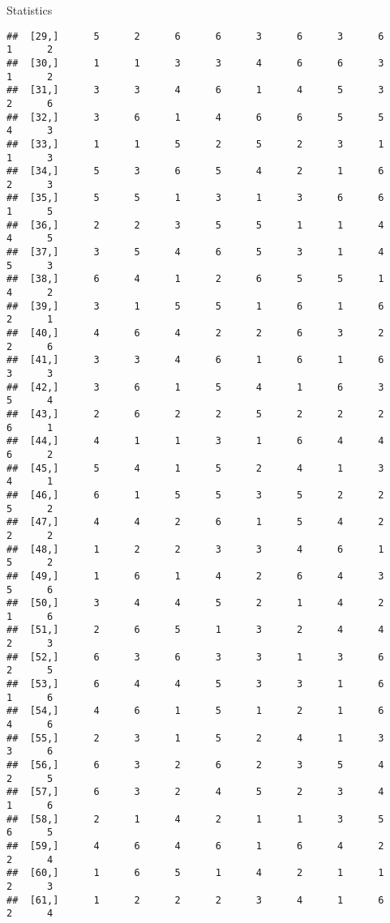 \documentclass[
  ignorenonframetext,
]{beamer}
\begin{document}
\begin{frame}[fragile]{Statistics}
\begin{verbatim}
##  [29,]      5      2      6      6      3      6      3      6      1      2
##  [30,]      1      1      3      3      4      6      6      3      1      2
##  [31,]      3      3      4      6      1      4      5      3      2      6
##  [32,]      3      6      1      4      6      6      5      5      4      3
##  [33,]      1      1      5      2      5      2      3      1      1      3
##  [34,]      5      3      6      5      4      2      1      6      2      3
##  [35,]      5      5      1      3      1      3      6      6      1      5
##  [36,]      2      2      3      5      5      1      1      4      4      5
##  [37,]      3      5      4      6      5      3      1      4      5      3
##  [38,]      6      4      1      2      6      5      5      1      4      2
##  [39,]      3      1      5      5      1      6      1      6      2      1
##  [40,]      4      6      4      2      2      6      3      2      2      6
##  [41,]      3      3      4      6      1      6      1      6      3      3
##  [42,]      3      6      1      5      4      1      6      3      5      4
##  [43,]      2      6      2      2      5      2      2      2      6      1
##  [44,]      4      1      1      3      1      6      4      4      6      2
##  [45,]      5      4      1      5      2      4      1      3      4      1
##  [46,]      6      1      5      5      3      5      2      2      5      2
##  [47,]      4      4      2      6      1      5      4      2      2      2
##  [48,]      1      2      2      3      3      4      6      1      5      2
##  [49,]      1      6      1      4      2      6      4      3      5      6
##  [50,]      3      4      4      5      2      1      4      2      1      6
##  [51,]      2      6      5      1      3      2      4      4      2      3
##  [52,]      6      3      6      3      3      1      3      6      2      5
##  [53,]      6      4      4      5      3      3      1      6      1      6
##  [54,]      4      6      1      5      1      2      1      6      4      6
##  [55,]      2      3      1      5      2      4      1      3      3      6
##  [56,]      6      3      2      6      2      3      5      4      2      5
##  [57,]      6      3      2      4      5      2      3      4      1      6
##  [58,]      2      1      4      2      1      1      3      5      6      5
##  [59,]      4      6      4      6      1      6      4      2      2      4
##  [60,]      1      6      5      1      4      2      1      1      2      3
##  [61,]      1      2      2      2      3      4      1      6      2      4

\end{verbatim}
\end{frame}
\end{document}

